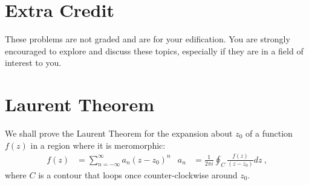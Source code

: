\documentclass[12pt]{article}
\numberwithin{equation}{section}    %
\begin{document}
\appendix
\section*{\Large Extra Credit}


These problems are not graded and are for your edification. You are strongly encouraged to explore and discuss these topics, especially if they are in a field of interest to you.


\section{Laurent Theorem}

We shall prove the Laurent Theorem for the expansion about $z_0$ of a function $f(z)$ in a region where it is meromorphic:
\begin{align}
f(z) &= \sum_{n=-\infty}^{\infty} a_n (z-z_0)^n
&
a_n &= \frac{1}{2\pi i} \oint_C \frac{f(z)}{(z-z_0)} dz \ ,
\end{align}
where $C$ is a contour that loops once counter-clockwise around $z_0$.
\end{document}
